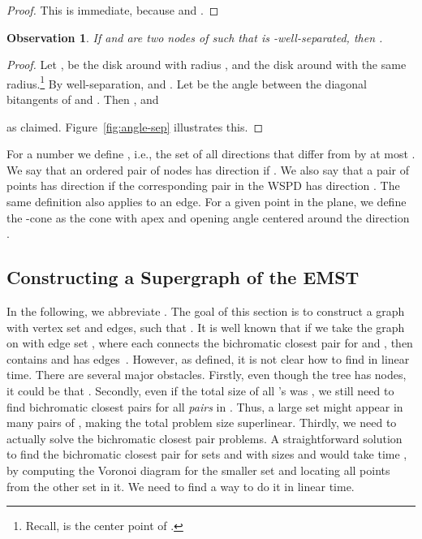 \documentclass[11pt]{paper}
\newtheorem {observation}[theorem] {Observation}
\begin{document}
\begin{proof}
This is immediate, because  and
.
\end{proof}

\begin{observation}\label{obs:small-Phi}
If  and  are two  nodes of  such that  is
-well-separated, then
.
\end{observation}

\begin{proof}
  Let ,  be the disk around  with radius
  , and  the disk around  with the same radius.\footnote
  {Recall,  is the center point of .}
  By well-separation,  and . Let 
  be the angle between the 
  diagonal bitangents of  and . Then
  , and 
   
  as claimed. 
  Figure~\ref {fig:angle-sep} illustrates this.
\end{proof}


For a number   we define
, i.e., the set
of all directions that differ from  by at most
. We say
that an ordered pair   of nodes has direction  if
.
We also say that a pair of points 
has direction
 if the corresponding pair in the WSPD has
direction . The same definition also applies to an edge.
For a given point  in the plane, we define the
-cone  as the cone with apex  and
opening angle  centered around the direction .

\subsection {Constructing a Supergraph of the EMST}\label{sec:emstsup}

In the following, we abbreviate .
The goal of this section is to construct a graph 
with vertex set  and  edges, such that
. 
It is well known that if we take the graph  on  with edge set
, where
each  connects the bichromatic closest pair for  and , 
then  contains  and has  edges~\cite{Eppstein00}.
However, as defined, it is not clear how to find  in linear time.
There are several major obstacles. Firstly, even though the tree 
has  nodes, it could be that .
Secondly, even if the total size of all 's was , we still need
to find bichromatic closest pairs for all \emph{pairs} in .
Thus, a large set  might appear in many pairs of
, making the total problem size superlinear. Thirdly,
we need to actually solve the bichromatic closest pair problems. A 
straightforward solution to find the bichromatic closest pair for
sets  and  with sizes  and  would take time 
, by computing the Voronoi diagram
for the smaller set and locating all points from the other set in it.
We need to find a way to do it in linear time.
\end{document}
